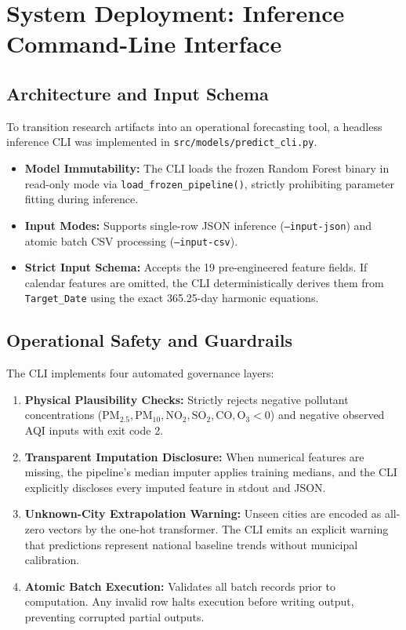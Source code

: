 \documentclass[11pt,a4paper]{report}
\begin{document}
\chapter{System Deployment: Inference Command-Line Interface}

\section{Architecture and Input Schema}
To transition research artifacts into an operational forecasting tool, a headless inference CLI was implemented in \texttt{src/models/predict\_cli.py}.
\begin{itemize}
    \item \textbf{Model Immutability:} The CLI loads the frozen Random Forest binary in read-only mode via \texttt{load\_frozen\_pipeline()}, strictly prohibiting parameter fitting during inference.
    \item \textbf{Input Modes:} Supports single-row JSON inference (\texttt{--input-json}) and atomic batch CSV processing (\texttt{--input-csv}).
    \item \textbf{Strict Input Schema:} Accepts the 19 pre-engineered feature fields. If calendar features are omitted, the CLI deterministically derives them from \texttt{Target\_Date} using the exact 365.25-day harmonic equations.
\end{itemize}

\section{Operational Safety and Guardrails}
The CLI implements four automated governance layers:
\begin{enumerate}
    \item \textbf{Physical Plausibility Checks:} Strictly rejects negative pollutant concentrations ($\text{PM}_{2.5}, \text{PM}_{10}, \text{NO}_2, \text{SO}_2, \text{CO}, \text{O}_3 < 0$) and negative observed AQI inputs with exit code 2.
    \item \textbf{Transparent Imputation Disclosure:} When numerical features are missing, the pipeline's median imputer applies training medians, and the CLI explicitly discloses every imputed feature in stdout and JSON.
    \item \textbf{Unknown-City Extrapolation Warning:} Unseen cities are encoded as all-zero vectors by the one-hot transformer. The CLI emits an explicit warning that predictions represent national baseline trends without municipal calibration.
    \item \textbf{Atomic Batch Execution:} Validates all batch records prior to computation. Any invalid row halts execution before writing output, preventing corrupted partial outputs.
\end{enumerate}
\end{document}
